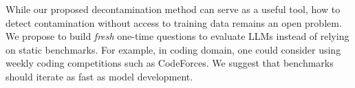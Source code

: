 While our proposed decontamination method can serve as a useful tool, how to detect contamination without access to training data remains an open problem.
We propose to build \textit{fresh} one-time questions to evaluate LLMs instead of relying on static benchmarks.
For example, in coding domain, one could consider using weekly coding competitions such as CodeForces.
We suggest that benchmarks should iterate as fast as model development.








